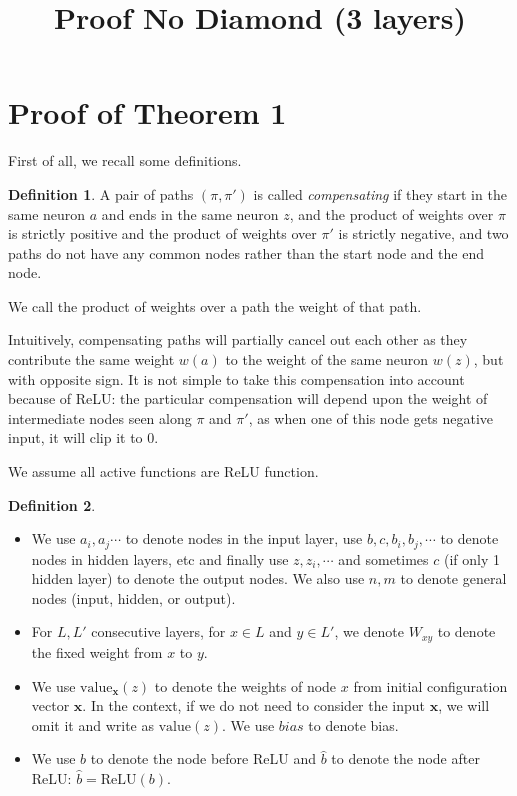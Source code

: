 \documentclass[]{article}
\title{Proof No Diamond (3 layers)}
\date{}
\theoremstyle{definition}
\newtheorem{definition}{Definition}
\newcommand{\ReLU}{\mathrm{ReLU}}
\newcommand{\Val}{\mathrm{value}}
\begin{document}
\section{Proof of Theorem 1}

First of all, we recall some definitions.




\begin{definition}
	A pair of paths $(\pi,\pi')$
	is called {\em compensating} if they start in the same neuron $a$ and 
	ends in the same neuron $z$, and the product of weights over $\pi$ is strictly positive and the product of weights over $\pi'$ is strictly negative, and two paths do not have any common nodes rather than the start node and the end node.
	
	We call the product of weights over a path the weight of that path.
\end{definition}

Intuitively, compensating paths will partially cancel out each other as they contribute the same weight $w(a)$ to the weight of the same neuron $w(z)$, but with opposite sign. 
It is not simple to take this compensation into account because of ReLU: the particular compensation will depend upon the weight of intermediate nodes seen along $\pi$ and $\pi'$, 
as when one of this node gets negative input, it will clip it to 0.


We assume all active functions are ReLU function.

\begin{definition}
	
	\begin{itemize}
		\item  We use $a_i,a_j\cdots$ to denote nodes in the input layer, use $b,c,b_i,b_j,\cdots$ to denote nodes in hidden layers, etc and finally use $z,z_i,\cdots$ and sometimes $c$ (if only 1 hidden layer) to denote the output nodes. We also use $n,m$ to denote general nodes (input, hidden, or output).
		
		
		\item For $L,L'$ consecutive layers, for $x \in L$ and $y \in L'$, we denote 
		$W_{xy}$ to denote the fixed weight from $x$ to $y$. 
		
		\item  We use
		$\Val_{\boldsymbol{x}}(z)$ to denote the weights of node $x$ from initial configuration vector $\boldsymbol{x}$. In the context, if we do not need to consider the input $\boldsymbol{x}$, we will omit it and write as $\Val(z)$.
		We use $bias$ to denote bias.
		
		\item We use $b$ to denote the node before ReLU and $\hat{b}$ to denote the node after ReLU: $\hat{b} = \ReLU(b)$.
	\end{itemize}
	
\end{definition}
\end{document}
